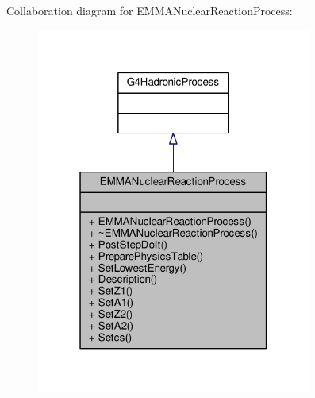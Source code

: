 Collaboration diagram for E\+M\+M\+A\+Nuclear\+Reaction\+Process\+:
\nopagebreak
\begin{figure}[H]
\begin{center}
\leavevmode
\includegraphics[width=256pt]{classEMMANuclearReactionProcess__coll__graph}
\end{center}
\end{figure}
